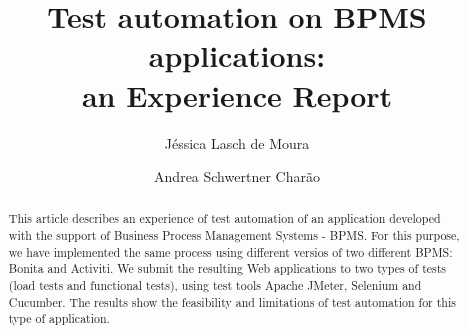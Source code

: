 \documentclass[runningheads,a4paper]{llncs}
\newcommand{\keywords}[1]{\par\addvspace\baselineskip
\noindent\keywordname\enspace\ignorespaces#1}
\begin{document}
\mainmatter  %

\title{
Test automation on BPMS applications: \\ an Experience Report}


%
%
\author{Jéssica Lasch de Moura
\and Andrea Schwertner Charão}
%


%
%

\maketitle


\begin{abstract}
This article describes an experience of test automation of an application developed with the support of Business Process Management Systems - BPMS. For this purpose, we have implemented the same process using different versios of two different BPMS: Bonita and Activiti. We submit the resulting Web applications to two types of tests (load tests and functional tests), using test tools Apache JMeter, Selenium and Cucumber. The results show the feasibility and limitations of test automation for this type of application.

\end{abstract}
\end{document}
